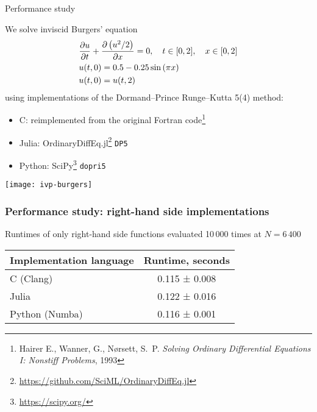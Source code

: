 \documentclass[10pt, aspectratio=169, progressbar=frametitle]{beamer}
\begin{document}
\begin{frame}{Performance study}

  \begin{minipage}{\dimexpr0.6\textwidth - 2\tabcolsep}
  We solve inviscid Burgers' equation
    \begin{align*}
      &\pdv{u}{t} + \pdv{\left( u^{2} / 2 \right)}{x} = 0,
      \quad t \in [0, 2], \quad x \in [0, 2] \\
      &u(t, 0) = 0.5 - 0.25 \sin \left( \pi x \right)\\
      &u(t, 0) = u(t, 2)
    \end{align*}
  using implementations of the Dormand--Prince Runge--Kutta 5(4) method:
  \begin{itemize}
  \item C: reimplemented from the original Fortran code\footnote{%
  Hairer E., Wanner, G., Nørsett, S.\ P. 
  \emph{Solving Ordinary Differential Equations I: Nonstiff Problems}, 1993}
  \item Julia: OrdinaryDiffEq.jl\footnote{%
          \url{https://github.com/SciML/OrdinaryDiffEq.jl}} \texttt{DP5}
  \item Python: SciPy\footnote{\url{https://scipy.org/}} \texttt{dopri5}
  \end{itemize}
  \end{minipage}\hfill
  \begin{minipage}{\dimexpr0.4\textwidth - 2\tabcolsep}
    \texttt{[image: ivp-burgers]}
  \end{minipage}
\end{frame}

\begin{frame}
  \frametitle{Performance study: right-hand side implementations}

  \centering
  Runtimes of only right-hand side functions
  evaluated 10\,000 times at $N=6\,400$
  \vspace{1em}

  \begin{tabular}{l c}
    \toprule
    Implementation language & Runtime, seconds \\
    \midrule
    C (Clang)               & 0.115 ± 0.008    \\
    Julia                   & 0.122 ± 0.016    \\
    Python (Numba)          & 0.116 ± 0.001    \\
    \bottomrule
  \end{tabular}
\end{frame}
\end{document}
